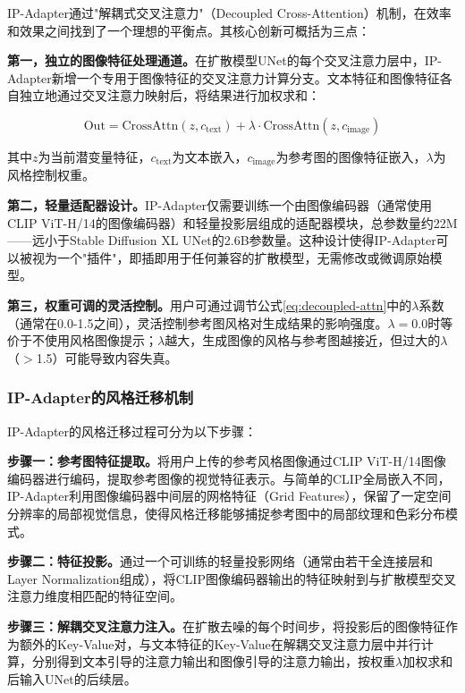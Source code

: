 \documentclass[12pt,a4paper]{ctexart}
\newcommand{\sdxl}{Stable Diffusion XL}
\newcommand{\ipadapter}{IP-Adapter}
\begin{document}
\ipadapter{}通过"解耦式交叉注意力"（Decoupled Cross-Attention）机制，在效率和效果之间找到了一个理想的平衡点。其核心创新可概括为三点：

\textbf{第一，独立的图像特征处理通道。}在扩散模型UNet的每个交叉注意力层中，\ipadapter{}新增一个专用于图像特征的交叉注意力计算分支。文本特征和图像特征各自独立地通过交叉注意力映射后，将结果进行加权求和：

\begin{equation}
\text{Out} = \text{CrossAttn}(z, c_{\text{text}}) + \lambda \cdot \text{CrossAttn}(z, c_{\text{image}})
\label{eq:decoupled-attn}
\end{equation}

其中$z$为当前潜变量特征，$c_{\text{text}}$为文本嵌入，$c_{\text{image}}$为参考图的图像特征嵌入，$\lambda$为风格控制权重。

\textbf{第二，轻量适配器设计。}\ipadapter{}仅需要训练一个由图像编码器（通常使用CLIP ViT-H/14的图像编码器）和轻量投影层组成的适配器模块，总参数量约22M——远小于\sdxl{} UNet的2.6B参数量。这种设计使得\ipadapter{}可以被视为一个"插件"，即插即用于任何兼容的扩散模型，无需修改或微调原始模型。

\textbf{第三，权重可调的灵活控制。}用户可通过调节公式\eqref{eq:decoupled-attn}中的$\lambda$系数（通常在0.0-1.5之间），灵活控制参考图风格对生成结果的影响强度。$\lambda = 0.0$时等价于不使用风格图像提示；$\lambda$越大，生成图像的风格与参考图越接近，但过大的$\lambda$（$>$1.5）可能导致内容失真。

\subsubsection{IP-Adapter的风格迁移机制}

\ipadapter{}的风格迁移过程可分为以下步骤：

\textbf{步骤一：参考图特征提取。}将用户上传的参考风格图像通过CLIP ViT-H/14图像编码器进行编码，提取参考图像的视觉特征表示。与简单的CLIP全局嵌入不同，\ipadapter{}利用图像编码器中间层的网格特征（Grid Features），保留了一定空间分辨率的局部视觉信息，使得风格迁移能够捕捉参考图中的局部纹理和色彩分布模式。

\textbf{步骤二：特征投影。}通过一个可训练的轻量投影网络（通常由若干全连接层和Layer Normalization组成），将CLIP图像编码器输出的特征映射到与扩散模型交叉注意力维度相匹配的特征空间。

\textbf{步骤三：解耦交叉注意力注入。}在扩散去噪的每个时间步，将投影后的图像特征作为额外的Key-Value对，与文本特征的Key-Value在解耦交叉注意力层中并行计算，分别得到文本引导的注意力输出和图像引导的注意力输出，按权重$\lambda$加权求和后输入UNet的后续层。
\end{document}
